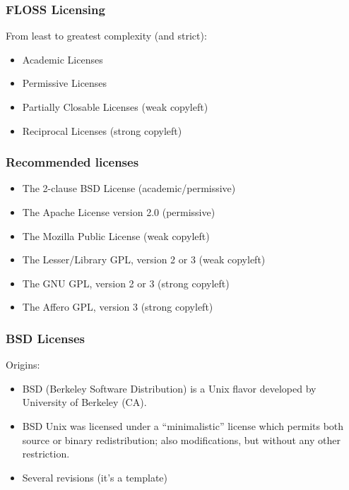 
\begin{frame}
\frametitle{FLOSS Licensing}

From least to greatest complexity (and strict):
\begin{itemize}
\item \alert{Academic Licenses}
\item \alert{Permissive Licenses}
\item \alert{Partially Closable Licenses} (weak copyleft)
\item \alert{Reciprocal Licenses} (strong copyleft)
\end{itemize}

\end{frame}


\begin{frame}
\frametitle{Recommended licenses}

\begin{itemize}
\item The 2-clause BSD License (academic/permissive)
\item The Apache License version 2.0 (permissive)
\item The Mozilla Public License (weak copyleft)
\item The Lesser/Library GPL, version 2 or 3 (weak copyleft)
\item The GNU GPL, version 2 or 3 (strong copyleft)
\item The Affero GPL, version 3 (strong copyleft)
\end{itemize}

\end{frame}



\begin{frame}
\frametitle{BSD Licenses}

Origins:
\begin{itemize}
\item BSD (Berkeley Software Distribution) is a Unix flavor developed
  by University of Berkeley (CA).
\item BSD Unix was licensed under a ``minimalistic'' license which
  permits both source or binary redistribution; also modifications,
  but without any other restriction.
\item Several revisions (it's a template)
\end{itemize}

\end{frame}



